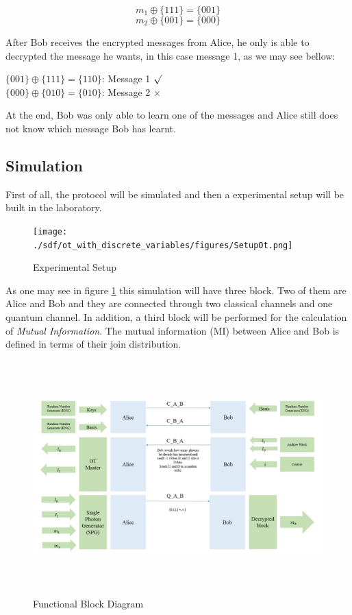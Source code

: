 $$m_{1} \oplus{} \{ 1 1 1 \} = \{ 0 0 1\}$$
$$m_{2} \oplus{} \{ 0 0 1 \} = \{ 0 0 0\}$$

After Bob receives the encrypted messages from Alice, he only is able to decrypted the message he wants, in this case message 1, as we may see bellow:
\begin{center}
$\{ 0 0 1\} \oplus{} \{ 1 1 1\} = \{ 1 1 0\} $: Message 1 $\surd$ \\
$\{ 0 0 0\} \oplus{} \{ 0 1 0\} = \{ 0 1 0\} $: Message 2 $\times$ \\
\end{center}

At the end, Bob was only able to learn one of the messages and Alice still does not know which message Bob has learnt.

\subsection{Simulation}

First of all, the protocol will be simulated and then a experimental setup will be built in the laboratory.

\begin{figure}[H]
	\centering
	\texttt{[image: ./sdf/ot\_with\_discrete\_variables/figures/SetupOt.png]}
	\caption{Experimental Setup}\label{experimentalsetup}
\end{figure}

As one may see in figure \ref{experimentalsetup} this simulation will have three block. Two of them are Alice and Bob and they are connected through two classical channels and one quantum channel. In addition, a third block will be performed for the calculation of \textit{Mutual Information}. The mutual information (MI) between Alice and Bob is defined in terms of their join distribution.

\begin{figure}[h]
	\centering \includegraphics[width=1.1\textwidth,height=9cm]{./sdf/ot_with_discrete_variables/figures/DiagramBlock_Simulation.jpg}
	\caption{Functional Block Diagram}\label{functionalblockdiagram}
\end{figure}


